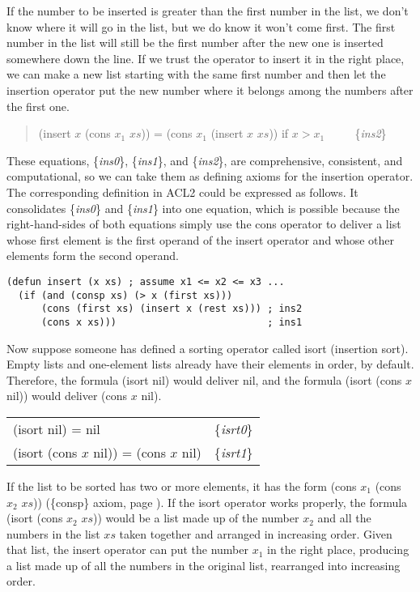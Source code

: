 If the number to be inserted is greater than the first number
in the list, we don't know where it will go in the list,
but we do know it won't come first.
The first number in the list will still be the first number
after the new one is inserted somewhere down the line.
If we trust the operator to insert it in the right place,
we can make a new list starting with the same first number
and then  let the insertion operator put the new number
where it belongs among the numbers after the first one.

\begin{quote}
(insert $x$ (cons $x_1$ $xs$)) = (cons $x_1$ (insert $x$ $xs$)) if $x > x_1$ ~~~~ \{\emph{ins2}\}
\end{quote}

These equations, \{\emph{ins0}\}, \{\emph{ins1}\}, and \{\emph{ins2}\},
are comprehensive, consistent, and computational,
so we can take them as defining axioms for the insertion operator.
The corresponding definition in ACL2 could be expressed as follows.
It consolidates \{\emph{ins0}\} and \{\emph{ins1}\} into one equation,
which is possible because the right-hand-sides of both equations
simply use the cons operator to deliver a list whose first element
is the first operand of the insert operator and whose other elements
form the second operand.

\label{defun:insert-isort}
\begin{Verbatim}
(defun insert (x xs) ; assume x1 <= x2 <= x3 ...
  (if (and (consp xs) (> x (first xs)))
      (cons (first xs) (insert x (rest xs))) ; ins2
      (cons x xs)))                          ; ins1
\end{Verbatim}

Now suppose someone has defined a sorting operator called isort
(insertion sort).
Empty lists and one-element lists already have their
elements in order, by default.
Therefore, the formula (isort nil) would deliver nil,
and the formula (isort (cons $x$ nil)) would deliver
(cons $x$ nil).

\begin{center}
\label{eq:isrt0}
\label{eq:isrt1}
\begin{tabular}{ll}
(isort nil) = nil                       & \{\emph{isrt0}\} \\
(isort (cons $x$ nil)) = (cons $x$ nil) & \{\emph{isrt1}\} \\
\end{tabular}
\end{center}

If the list to be sorted has two or more elements,
it has the form (cons $x_1$ (cons $x_2$ $xs$)) (\{consp\} axiom, page \pageref{consp-axiom}).
If the isort operator works properly,
the formula (isort (cons $x_2$ $xs$)) would be
a list made up of the number $x_2$ and all the numbers in the list $xs$
taken together and
arranged in increasing order.
Given that list, the insert operator can put the number $x_1$ in
the right place, producing a list made up of all the
numbers in the original list, rearranged into increasing order.

